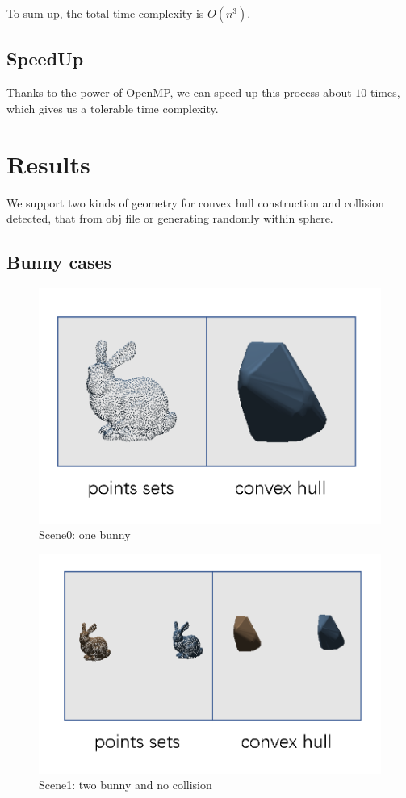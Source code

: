 \documentclass[acmtog]{acmart}
\begin{document}
	\quad To sum up, the total time complexity is $O(n^3)$.
\subsection*{SpeedUp}
	\qquad Thanks to the power of OpenMP, we can speed up this process about $10$ times, which gives us a tolerable time complexity.
	
\section{Results}
	We support two kinds of geometry for convex hull construction and collision detected, that from obj file or generating randomly within sphere.
\subsection{Bunny cases}

\begin{figure}[htbp]
	\centering
	\includegraphics[scale=0.2]{scene0.png}
	\caption{Scene0: one bunny}
	\label{fig:0}
\end{figure}

\begin{figure}[htbp]
	\centering
	\includegraphics[scale=0.2]{scene1.png}
	\caption{Scene1: two bunny and no collision}
	\label{fig:1}
\end{figure}
\end{document}

